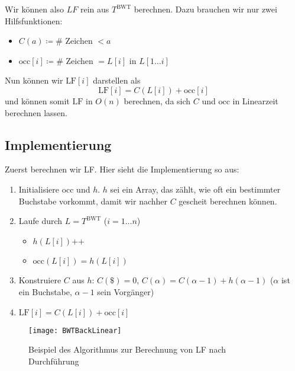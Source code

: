 Wir können also \( LF \) rein aus \( T^{\text{BWT}} \) berechnen. Dazu brauchen wir nur zwei Hilfsfunktionen:

\begin{itemize}
  \item \( C(a) \coloneqq \# \) Zeichen \( < a \)
  \item \( \text{occ}[i] \coloneqq \# \) Zeichen \( = L[i] \) in \( L[1\dots i] \)
\end{itemize}

Nun können wir \( \text{LF}[i] \) darstellen als
\begin{equation*}
  \text{LF}[i] = C(L[i]) + \text{occ}[i]
\end{equation*}
und können somit \( \text{LF} \) in \( O(n) \) berechnen, da sich \( C \) und \( \text{occ} \) in Linearzeit berechnen lassen.

\subsection{Implementierung}

Zuerst berechnen wir LF. Hier sieht die Implementierung so aus:

\begin{enumerate}
  \item Initialisiere occ und \( h \). \( h \) sei ein Array, das zählt, wie oft ein bestimmter Buchstabe vorkommt, damit wir nachher \( C \) gescheit berechnen können.
  \item Laufe durch \( L = T^{\text{BWT}} \) (\( i = 1 \dots n \))
  \begin{itemize}
    \item \( h(L[i]) \)++
    \item \( \text{occ}(L[i]) = h(L[i]) \)
  \end{itemize}
  \item Konstruiere \( C \) aus \( h \): \( C(\texttt{\$}) = 0 \), \( C(\alpha) = C(\alpha - 1) + h(\alpha - 1) \) (\( \alpha \) ist ein Buchstabe, \( \alpha - 1 \) sein Vorgänger)
  \item \( \text{LF}[i] = C(L[i]) + \text{occ}[i] \)
\end{enumerate}

\begin{figure}[H]
  \texttt{[image: BWTBackLinear]}
  \caption{Beispiel des Algorithmus zur Berechnung von LF nach Durchführung}
\end{figure}

